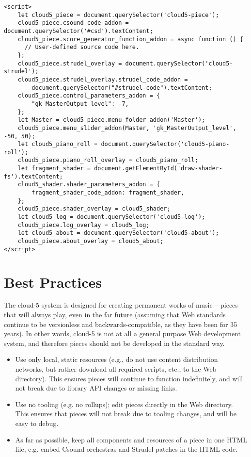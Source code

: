 \documentclass[runningheads,a4paper]{llncs}
\begin{document}
\begin{verbatim}
<script>
    let cloud5_piece = document.querySelector('cloud5-piece');
    cloud5_piece.csound_code_addon = document.querySelector('#csd').textContent;
    cloud5_piece.score_generator_function_addon = async function () {
      // User-defined source code here.
    };
    cloud5_piece.strudel_overlay = document.querySelector('cloud5-strudel');
    cloud5_piece.strudel_overlay.strudel_code_addon = 
        document.querySelector("#strudel-code").textContent;
    cloud5_piece.control_parameters_addon = {
        "gk_MasterOutput_level": -7,
    };
    let Master = cloud5_piece.menu_folder_addon('Master');
    cloud5_piece.menu_slider_addon(Master, 'gk_MasterOutput_level', -50, 50);
    let cloud5_piano_roll = document.querySelector('cloud5-piano-roll');
    cloud5_piece.piano_roll_overlay = cloud5_piano_roll;
    let fragment_shader = document.getElementById('draw-shader-fs').textContent;
    cloud5_shader.shader_parameters_addon = {
        fragment_shader_code_addon: fragment_shader,
    };
    cloud5_piece.shader_overlay = cloud5_shader;
    let cloud5_log = document.querySelector('cloud5-log');
    cloud5_piece.log_overlay = cloud5_log;
    let cloud5_about = document.querySelector('cloud5-about');
    cloud5_piece.about_overlay = cloud5_about;
</script>
\end{verbatim}

\section{Best Practices}

The cloud-5 system is designed for creating permanent works of music -- pieces that will always play, even in the far future (assuming that Web standards continue to be versionless and backwards-compatible, as they have been for 35 years). In other words, cloud-5 is not at all a general purpose Web development system, and therefore pieces should not be developed in the standard way.

\begin{itemize}
\item Use only local, static resources (e.g., do not use content distribution networks, but rather download all required scripts, etc., to the Web directory). This ensures pieces will continue to function indefinitely, and will not break due to library API changes or missing links.
\item Use no tooling (e.g. no rollups); edit pieces directly in the Web directory. This ensures that pieces will not break due to tooling changes, and will be easy to debug.
\item As far as possible, keep all components and resources of a piece in one HTML file, e.g. embed Csound orchestras and Strudel patches in the HTML code.
\end{itemize}
\end{document}
